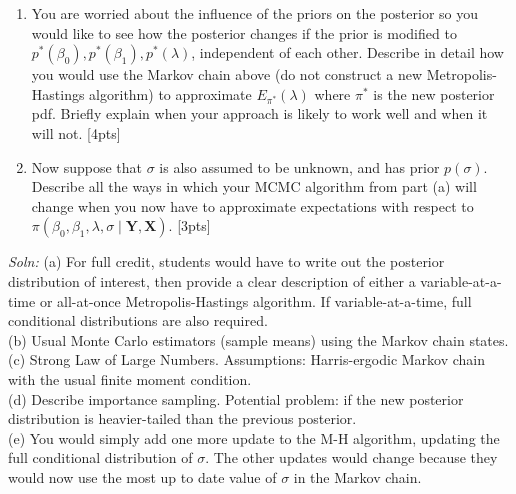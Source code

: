 \documentclass[12pt]{article}
\begin{document}
\begin{enumerate}
\begin{enumerate}
\item You are worried about the influence of the priors on the
  posterior so you would like to see how the posterior changes if the
  prior is modified to $p^*(\beta_0), p^*(\beta_1), p^*(\lambda)$,
  independent of each other. Describe in detail how you would use the
  Markov chain above (do not construct a new Metropolis-Hastings
  algorithm) to approximate $E_{\pi^*}(\lambda)$ where $\pi^*$ is the
  new posterior pdf. Briefly explain when your approach is likely to
  work well and when it will not. [4pts]
\item Now suppose that $\sigma$ is also assumed to be unknown, and has
  prior $p(\sigma)$. Describe all the ways in which your MCMC
  algorithm from part (a) will change when you now have to approximate expectations
  with respect to $\pi(\beta_0, \beta_1, \lambda, \sigma \mid  {\mathbf Y}, {\mathbf X})$. [3pts]
\newpage
\phantom{boo}
\end{enumerate}
{\it Soln:} (a) For full credit, students would have to write out the posterior distribution of interest, then provide a clear description of either a variable-at-a-time or all-at-once Metropolis-Hastings algorithm. If  variable-at-a-time, full conditional distributions are also required.\\
(b) Usual Monte Carlo estimators (sample means) using the Markov chain states.\\
(c) Strong Law of Large Numbers. Assumptions: Harris-ergodic Markov chain with the usual finite moment condition.\\
(d) Describe importance sampling. Potential problem: if the new posterior distribution is heavier-tailed than the previous posterior.\\
(e) You would simply add one more update to the M-H algorithm, updating the full conditional distribution of $\sigma$. The other updates would change because they would now use the most up to date value of $\sigma$ in the Markov chain.
\end{enumerate}
\end{document}
